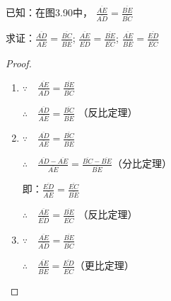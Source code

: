 \begin{example}
    已知：在图3.90中，
$\frac{\overline{AE}}{\overline{AD}}=\frac{\overline{BE}}{\overline{BC}}$

求证：$\frac{\overline{AD}}{\overline{AE}}=\frac{\overline{BC}}{\overline{BE}}$; $\frac{\overline{AE}}{\overline{ED}}=\frac{\overline{BE}}{\overline{EC}}$; $\frac{\overline{AE}}{\overline{BE}}=\frac{\overline{ED}}{\overline{EC}}$
\end{example}

\begin{figure}[htp]
    \centering
{}
    \caption{}
\end{figure}

\begin{proof}
\begin{enumerate}
    \item $\because\quad \frac{\overline{AE}}{\overline{AD}}=\frac{\overline{BE}}{\overline{BC}}$
    
    $\therefore\quad \frac{\overline{AD}}{\overline{AE}}=\frac{\overline{BC}}{\overline{BE}}$ （反比定理）

    \item $\because\quad \frac{\overline{AD}}{\overline{AE}}=\frac{\overline{BC}}{\overline{BE}}$
    
    $\therefore\quad \frac{\overline{AD}-\overline{AE}}{\overline{AE}}=\frac{\overline{BC}-\overline{BE}}{\overline{BE}}$（分比定理）

    即：$\frac{\overline{ED}}{\overline{AE}}=\frac{\overline{EC}}{\overline{BE}}$

    $\therefore\quad \frac{\overline{AE}}{\overline{ED}}=\frac{\overline{BE}}{\overline{EC}}$ （反比定理）

    \item $\because\quad \frac{\overline{AE}}{\overline{AD}}=\frac{\overline{BE}}{\overline{BC}}$
    
$\therefore\quad \frac{\overline{AE}}{\overline{BE}}=\frac{\overline{ED}}{\overline{EC}}$（更比定理）
\end{enumerate}
\end{proof}



